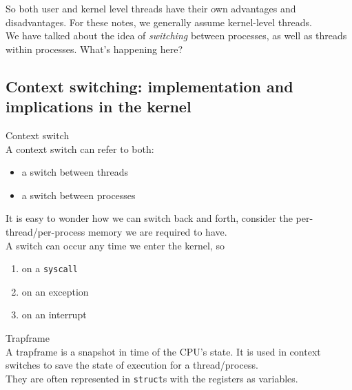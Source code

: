 \documentclass[journal, letterpaper]{IEEEtran}
\begin{document}
So both user and kernel level threads have their own advantages and disadvantages. For these notes, we generally assume kernel-level threads.
\newline \\ 
We have talked about the idea of \textit{switching} between processes, as well as threads within processes. What's
happening here?
\subsection{Context switching: implementation and implications in the kernel}
\begin{theory}{Context switch} \\
    A context switch can refer to both:
    \begin{itemize}
        \item a switch between threads
        \item a switch between processes
    \end{itemize}
    It is easy to wonder how we can switch back and forth, consider the per-thread/per-process memory we are required to have.
    \newline \\ 
    A switch can occur any time we enter the kernel, so
    \begin{enumerate}
        \item on a \verb|syscall|
        \item on an exception
        \item on an interrupt
    \end{enumerate}
\end{theory}
\begin{theory}{Trapframe} \\
    A trapframe is a snapshot in time of the CPU's state. It is used in context switches to 
    save the state of execution for a thread/process.
    \newline \\
    They are often represented in \verb|struct|s with the registers as variables.
\end{theory}
\end{document}
